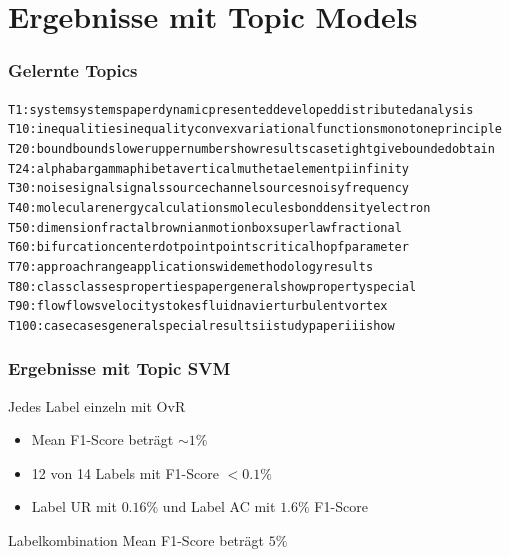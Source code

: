\documentclass[12pt, xcolor=table]{beamer}
\begin{document}
\section{Ergebnisse mit Topic Models}
\begin{frame}[fragile]
    \frametitle{Gelernte Topics}
    \begin{alltt}
    \tiny T1: system systems paper dynamic presented developed distributed analysis\\
        \tiny T10: inequalities inequality convex variational functions monotone principle\\
        \tiny T20: bound bounds lower upper number show results case tight give bounded obtain \\
        \tiny T24: alpha bar gamma phi beta vertical mu theta element pi infinity \\
        \tiny T30: noise signal signals source channel sources noisy frequency \\
        \tiny T40: molecular energy calculations molecules bond density electron \\
        \tiny T50: dimension fractal brownian motion box super law fractional \\
        \tiny T60: bifurcation center dot point points critical hopf parameter \\
        \tiny T70: approach range applications wide methodology results \\
        \tiny T80: class classes properties paper general show property special \\
        \tiny T90: flow flows velocity stokes fluid navier turbulent vortex \\
        \tiny T100: case cases general special results ii study paper iii show
    \end{alltt}
\end{frame}

\begin{frame}
    \frametitle{Ergebnisse mit Topic SVM}
    \begin{block}{Jedes Label einzeln mit OvR}
        \begin{itemize}
            \item Mean F1-Score beträgt $\sim 1 \%$
            \item 12 von 14 Labels mit F1-Score $< 0.1 \%$
            \item Label UR mit $0.16 \%$ und Label AC mit $1.6 \%$ F1-Score
        \end{itemize}
    \end{block}
    \begin{block}{Labelkombination}
        Mean F1-Score beträgt $5 \%$
    \end{block}
\end{frame}
\end{document}

